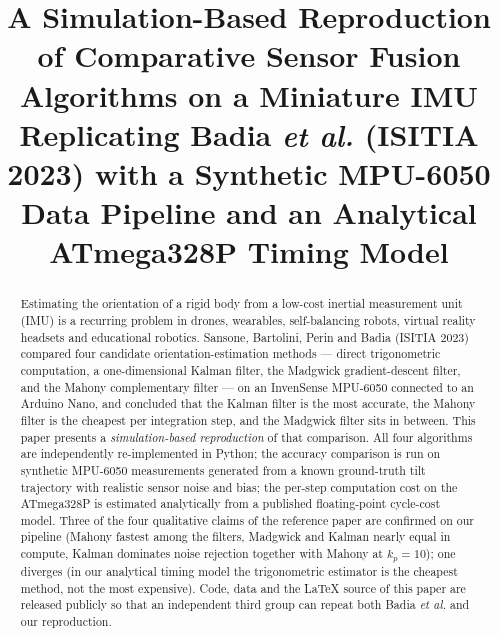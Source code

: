 \documentclass[conference]{IEEEtran}
\begin{document}
\title{A Simulation-Based Reproduction of Comparative Sensor
Fusion Algorithms on a Miniature IMU\\
{\large Replicating Badia \textit{et al.} (ISITIA 2023) with a
Synthetic MPU-6050 Data Pipeline and an Analytical ATmega328P
Timing Model}}

\author{
}

\maketitle

\begin{abstract}
Estimating the orientation of a rigid body from a low-cost inertial
measurement unit (IMU) is a recurring problem in drones, wearables,
self-balancing robots, virtual reality headsets and educational
robotics. Sansone, Bartolini, Perin and Badia (ISITIA 2023) compared
four candidate orientation-estimation methods --- direct
trigonometric computation, a one-dimensional Kalman filter, the
Madgwick gradient-descent filter, and the Mahony complementary
filter --- on an InvenSense MPU-6050 connected to an Arduino Nano,
and concluded that the Kalman filter is the most accurate, the
Mahony filter is the cheapest per integration step, and the
Madgwick filter sits in between. This paper presents a
\emph{simulation-based reproduction} of that comparison. All four
algorithms are independently re-implemented in Python; the
accuracy comparison is run on synthetic MPU-6050 measurements
generated from a known ground-truth tilt trajectory with realistic
sensor noise and bias; the per-step computation cost on the
ATmega328P is estimated analytically from a published
floating-point cycle-cost model. Three of the four qualitative
claims of the reference paper are confirmed on our pipeline (Mahony
fastest among the filters, Madgwick and Kalman nearly equal in
compute, Kalman dominates noise rejection together with Mahony at
$k_p=10$); one diverges (in our analytical timing model the
trigonometric estimator is the cheapest method, not the most
expensive). Code, data and the LaTeX source of this paper are
released publicly so that an independent third group can repeat
both Badia \textit{et al.} and our reproduction.
\end{abstract}
\end{document}
